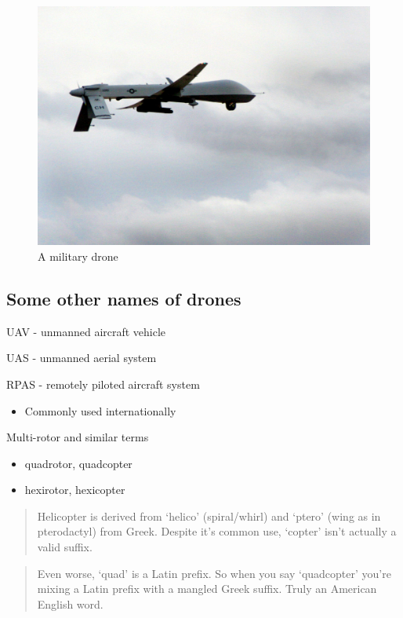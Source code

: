 \documentclass[
]{book}
\providecommand{\tightlist}{%
  \setlength{\itemsep}{0pt}\setlength{\parskip}{0pt}}
\theoremstyle{definition}
\theoremstyle{definition}
\theoremstyle{definition}
\theoremstyle{remark}
\begin{document}
\begin{figure}

{\centering \includegraphics[width=0.5\linewidth]{images/general/military_drone} 

}

\caption{A military drone}\label{fig:militarydrone}
\end{figure}

\hypertarget{some-other-names-of-drones}{%
\subsection{Some other names of drones}\label{some-other-names-of-drones}}

UAV - unmanned aircraft vehicle

UAS - unmanned aerial system

RPAS - remotely piloted aircraft system

\begin{itemize}
\tightlist
\item
  Commonly used internationally
\end{itemize}

Multi-rotor and similar terms

\begin{itemize}
\tightlist
\item
  quadrotor, quadcopter
\item
  hexirotor, hexicopter
\end{itemize}

\begin{quote}
Helicopter is derived from `helico' (spiral/whirl) and `ptero' (wing as in pterodactyl) from Greek. Despite it's common use, `copter' isn't actually a valid suffix.
\end{quote}

\begin{quote}
Even worse, `quad' is a Latin prefix. So when you say `quadcopter' you're mixing a Latin prefix with a mangled Greek suffix. Truly an American English word.
\end{quote}
\end{document}
